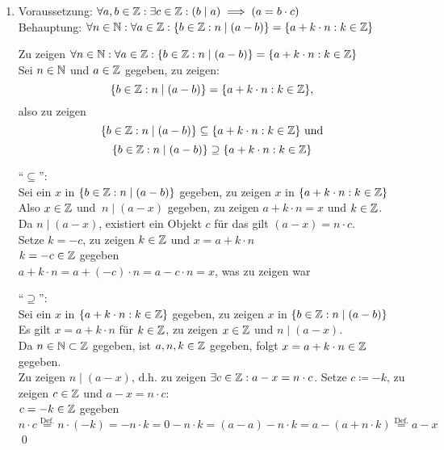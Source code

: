 \documentclass{gadsescript}
\begin{document}
\begin{enumerate}[label=(\alph*)]
\begin{enumerate}[label=(\roman*)]
		\end{enumerate}
	\item Voraussetzung: $\forall a,b \in \mathbb{Z} : \exists c \in \mathbb{Z} : \left( b \mid a \right) \implies \left( a = b \cdot c \right) $\\
		Behauptung: $ \forall n \in \mathbb{N} : \forall a \in \mathbb{Z}:\{ b \in \mathbb{Z} : n \mid ( a - b ) \} = \{ a + k \cdot n : k \in \mathbb{Z} \} $\\
		\begin{proof*}
			Zu zeigen $ \forall n \in \mathbb{N} : \forall a \in \mathbb{Z}:\{ b \in \mathbb{Z} : n \mid ( a - b ) \} = \{ a + k \cdot n : k \in \mathbb{Z} \}   $\\
			Sei $n \in \mathbb{N} $ und $a \in \mathbb{Z}$ gegeben, zu zeigen:
			\[ \{ b \in \mathbb{Z} : n \mid ( a - b ) \} = \{ a + k \cdot n : k \in \mathbb{Z} \}, \]
			also zu zeigen
			\[ \{ b \in \mathbb{Z} : n \mid ( a - b ) \} \subseteq \{ a + k \cdot n : k \in \mathbb{Z} \} \text{ und} \]
			\[ \{ b \in \mathbb{Z} : n \mid ( a - b ) \} \supseteq \{ a + k \cdot n : k \in \mathbb{Z} \} \]\par
			``$\subseteq$'':\\
			Sei ein $ x $ in $ \{ b \in \mathbb{Z} : n \mid ( a - b ) \} $ gegeben, zu zeigen $ x $ in $ \{ a + k \cdot n : k \in \mathbb{Z} \} $\\
			Also $ x \in \mathbb{Z} $ und $ \ n \mid ( a - x ) $ gegeben, zu zeigen $ a + k \cdot n = x$ und $ k \in \mathbb{Z} $.\\
			Da $ n \mid ( a - x ) $, existiert ein Objekt $ c $ für das gilt $ ( a - x ) = n \cdot c $.\\
			Setze $ k = - c$, zu zeigen $ k \in \mathbb{Z} $ und $ x = a + k \cdot n $\\
			$ k = -c \in \mathbb{Z} $ gegeben\\
			$ a + k \cdot n = a + (-c) \cdot n = a - c \cdot n = x $, was zu zeigen war\\\par
			``$\supseteq$'':\\
			Sei ein $ x $ in $ \{ a + k \cdot n : k \in \mathbb{Z} \} $ gegeben, zu zeigen $ x $ in $ \{ b \in \mathbb{Z} : n \mid ( a - b ) \} $\\
			Es gilt $ x = a + k \cdot n $ für $ k \in \mathbb{Z} $, zu zeigen $ x \in \mathbb{Z} $ und $ n \mid ( a - x ) $.\\
			Da $ n \in \mathbb{N} \subset \mathbb{Z} $ gegeben, ist $ a, n, k \in \mathbb{Z} $ gegeben, folgt $ x = a + k \cdot n \in \mathbb{Z} $ gegeben.\\
			Zu zeigen $ n \mid ( a - x ) $, d.h. zu zeigen $ \exists c \in \mathbb{Z} : a - x = n \cdot c $.
			Setze $ c \coloneqq -k$, zu zeigen $ c \in \mathbb{Z} $ und $ a - x = n \cdot c $:\\
			$ c = -k \in \mathbb{Z} $ gegeben\\
			$ n \cdot c \overset{\text{Def.}}{=} n \cdot (-k) = - n \cdot k = 0 - n \cdot k = (a - a) - n \cdot k = a - ( a + n \cdot k ) \overset{\text{Def.}}{=} a - x $\qed

		\end{proof*}

\end{enumerate}
\end{document}
